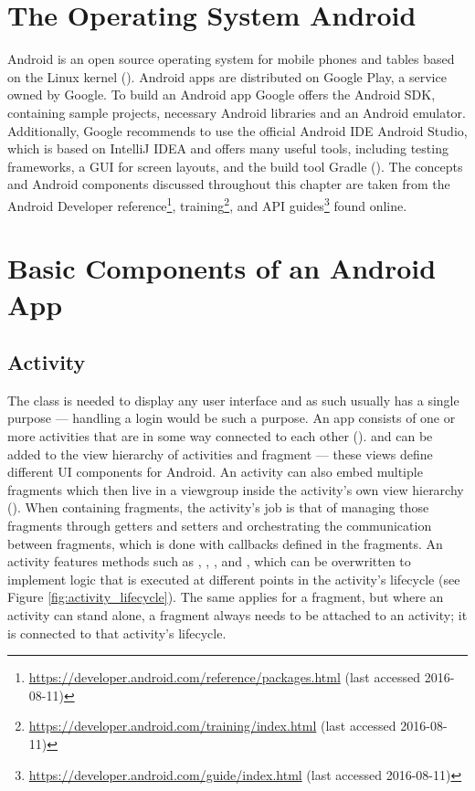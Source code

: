 \section{The Operating System Android}
Android is an open source operating system for mobile phones and tables based on the Linux kernel (\cite{androiddef}). Android apps are distributed on Google Play, a service owned by Google. To build an Android app Google offers the Android \gls{SDK}, containing sample projects, necessary Android libraries and an Android emulator. Additionally, Google recommends to use the official Android \gls{IDE} Android Studio, which is based on IntelliJ IDEA and offers many useful tools, including testing frameworks, a \gls{GUI} for screen layouts, and the build tool Gradle (\cite{androidstudio}). The concepts and Android components discussed throughout this chapter are taken from the Android Developer reference\footnote{\url{https://developer.android.com/reference/packages.html} (last accessed 2016-08-11)}, training\footnote{\url{https://developer.android.com/training/index.html} (last accessed 2016-08-11)}, and \gls{API} guides\footnote{\url{https://developer.android.com/guide/index.html} (last accessed 2016-08-11)} found online.

\section{Basic Components of an Android App}

\subsection{Activity}
The  class is needed to display any user interface and as such usually has a single purpose --- handling a login would be such a purpose. An app consists of one or more activities that are in some way connected to each other (\cite{activities_in_app}).  and  can be added to the view hierarchy of activities and fragment --- these views define different UI components for Android. An activity can also embed multiple fragments which then live in a viewgroup inside the activity's own view hierarchy (\cite{androidfragment}). When containing fragments, the activity’s job is that of managing those fragments through getters and setters and orchestrating the communication between fragments, which is done with callbacks defined in the fragments. 
An activity features methods such as , , , and , which can be overwritten to implement logic that is executed at different points in the activity's lifecycle (see Figure \ref{fig:activity_lifecycle}). The same applies for a fragment, but where an activity can stand alone, a fragment always needs to be attached to an activity; it is connected to that activity's lifecycle.

